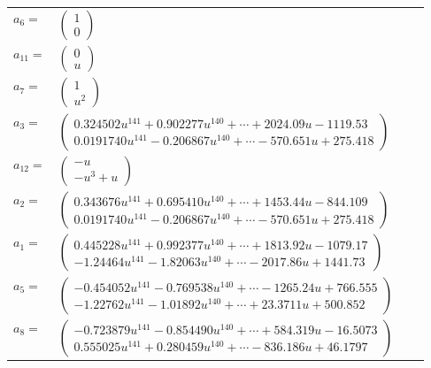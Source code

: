 \documentclass[1p]{elsarticle_modified}
\theoremstyle{definition}
\begin{document}
\begin{tabular}{m{7pt} m{180pt} m{7pt} m{180pt} }
\flushright $a_{6}=$&$\begin{pmatrix}1\\0\end{pmatrix}$ \\
\flushright $a_{11}=$&$\begin{pmatrix}0\\u\end{pmatrix}$ \\
\flushright $a_{7}=$&$\begin{pmatrix}1\\u^2\end{pmatrix}$ \\
\flushright $a_{3}=$&$\begin{pmatrix}0.324502 u^{141}+0.902277 u^{140}+\cdots+2024.09 u-1119.53\\0.0191740 u^{141}-0.206867 u^{140}+\cdots-570.651 u+275.418\end{pmatrix}$ \\
\flushright $a_{12}=$&$\begin{pmatrix}- u\\- u^3+u\end{pmatrix}$ \\
\flushright $a_{2}=$&$\begin{pmatrix}0.343676 u^{141}+0.695410 u^{140}+\cdots+1453.44 u-844.109\\0.0191740 u^{141}-0.206867 u^{140}+\cdots-570.651 u+275.418\end{pmatrix}$ \\
\flushright $a_{1}=$&$\begin{pmatrix}0.445228 u^{141}+0.992377 u^{140}+\cdots+1813.92 u-1079.17\\-1.24464 u^{141}-1.82063 u^{140}+\cdots-2017.86 u+1441.73\end{pmatrix}$ \\
\flushright $a_{5}=$&$\begin{pmatrix}-0.454052 u^{141}-0.769538 u^{140}+\cdots-1265.24 u+766.555\\-1.22762 u^{141}-1.01892 u^{140}+\cdots+23.3711 u+500.852\end{pmatrix}$ \\
\flushright $a_{8}=$&$\begin{pmatrix}-0.723879 u^{141}-0.854490 u^{140}+\cdots+584.319 u-16.5073\\0.555025 u^{141}+0.280459 u^{140}+\cdots-836.186 u+46.1797\end{pmatrix}$ \\

\end{tabular}
\end{document}
